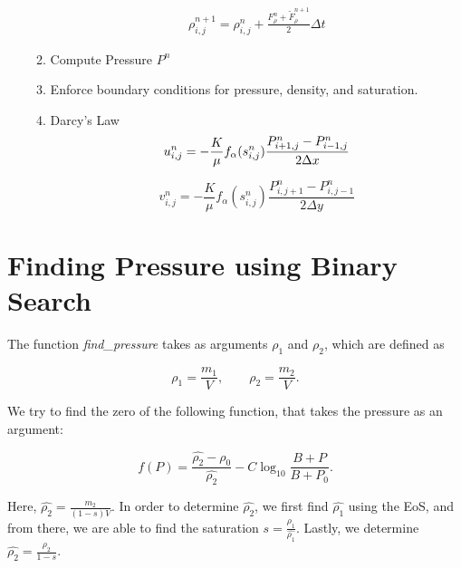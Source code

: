 \documentclass[a4paper,12pt]{article}
\begin{document}
\begin{enumerate}
\begin{enumerate}
\begin{align*}
    \rho_{i, j}^{n + 1} = \rho_{i, j}^n + \frac{F_\rho^n
    + \tilde F_\rho^{n+1} }{2} \Delta t
\end{align*}

            \item Compute Pressure \(P^n\)
            \item Enforce boundary conditions for pressure,
                density, and saturation.
            \item Darcy's Law
\[
    u_{i,j}^n = -\frac{K}{\mu} f_\alpha (s_{i, j}^n)
    \frac{P_{i + 1, j}^n - P_{i - 1, j}^n}{2\Delta x} \\
\] 

\[
    v_{i,j}^n = -\frac{K}{\mu} f_\alpha(s_{i, j}^n)
    \frac{P_{i, j + 1}^n - P_{i, j - 1}^n}{2\Delta y}
\] 
        \end{enumerate}
\end{enumerate}


\section{Finding Pressure using Binary Search}

The function \emph{find\_pressure} takes as arguments
\(\rho_1\) and \(\rho_2\), which are defined as

\[
\rho_1 = \frac{m_1}{V}, \qquad
\rho_2 = \frac{m_2}{V}
.\] 

We try to find the zero of the following function, that
takes the pressure as an argument:

\begin{equation*}
    f(P) = \frac{\hat{\rho_2} - \rho_0}{\hat{\rho_2}}
    - C \log_{10} \frac{B + P}{B + P_0}
.\end{equation*}

Here, \(\hat{\rho_2} = \frac{m_2}{(1 - s)V}\).
In order to determine \(\hat{\rho_2}\), we first find
\(\hat{\rho_1}\) using the EoS, and from there, we are
able to find the saturation
\(s = \frac{\rho_1}{\hat{\rho_1}}\).
Lastly, we determine \(\hat{\rho_2} = \frac{\rho_2}{1 - s}\).

% 
% 
% 
\end{document}
